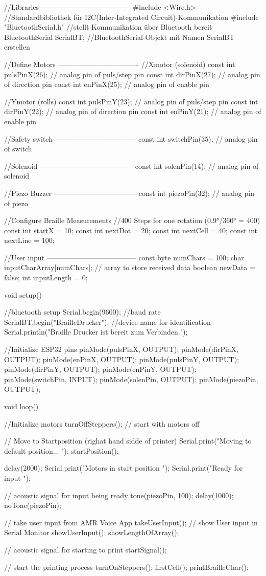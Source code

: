 //Libraries --------------------------------------
#include <Wire.h> 	//Standardbibliothek für I2C(Inter-Integrated Circuit)-Kommunikation
#include "BluetoothSerial.h"  //stellt Kommunikation über Bluetooth bereit
BluetoothSerial SerialBT;	//BluetoothSerial-Objekt mit Namen SerialBT erstellen

//Define Motors ----------------------------------
//Xmotor (solenoid)   
const int pulsPinX(26); // analog pin of puls/step pin
const int dirPinX(27);  // analog pin of direction pin
const int enPinX(25);   // analog pin of enable pin

//Ymotor (rolls)
const int pulsPinY(23); // analog pin of puls/step pin
const int dirPinY(22);  // analog pin of direction pin
const int enPinY(21);   // analog pin of enable pin

//Safety switch ----------------------------------
const int switchPin(35); // analog pin of switch

//Solenoid ---------------------------------------
const int solenPin(14); // analog pin of solenoid

//Piezo Buzzer -----------------------------------
const int piezoPin(32); // analog pin of piezo

//Configure Braille Measurements
//400 Steps for one rotation (0.9°/360° = 400)
const int startX = 10;
const int nextDot = 20;
const int nextCell = 40;
const int nextLine = 100;

//User input --------------------------------------
const byte numChars = 100;
char inputCharArray[numChars];  // array to store received data
boolean newData = false;
int inputLength = 0;

void setup() {
  //bluetooth setup
  Serial.begin(9600);  //baud rate
  SerialBT.begin("BrailleDrucker"); //device name for identification
  Serial.println("Braille Drucker ist bereit zum Verbinden.");

  //Initialize ESP32 pins
  pinMode(pulsPinX, OUTPUT);
  pinMode(dirPinX, OUTPUT);
  pinMode(enPinX, OUTPUT);
  pinMode(pulsPinY, OUTPUT);
  pinMode(dirPinY, OUTPUT);
  pinMode(enPinY, OUTPUT);
  pinMode(switchPin, INPUT);  
  pinMode(solenPin, OUTPUT); 
  pinMode(piezoPin, OUTPUT); 
}

void loop() {
  //Initialize motors
  turnOffSteppers(); // start with motors off
  
  // Move to Startposition (righat hand sidde of printer)
  Serial.print("Moving to default position... \n");
  startPosition();
 
  delay(2000);
  Serial.print("Motors in start position \n");
  Serial.print("Ready for input \n");

  // acoustic signal for input being ready
  tone(piezoPin, 100);
  delay(1000);
  noTone(piezoPin);

  // take user input from AMR Voice App
  takeUserInput();
  // show User input in Serial Monitor
  showUserInput();
  showLengthOfArray();
  
  // acoustic signal for starting to print
  startSignal();

  // start the printing process
  turnOnSteppers();
  firstCell();
  printBrailleChar();
}